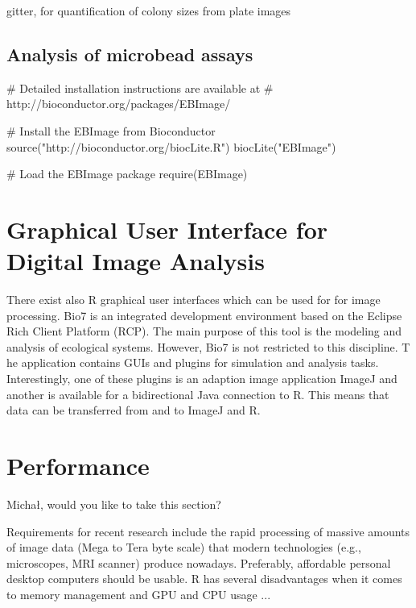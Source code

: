 gitter, for quantification of colony sizes from plate images \citep{wagih_gitter:_2014}


\subsection{Analysis of microbead assays}

\citep{rodiger_nucleic_2014, rodiger_highly_2013}

\begin{example}
# Detailed installation instructions are available at 
# http://bioconductor.org/packages/EBImage/

# Install the EBImage from Bioconductor
source("http://bioconductor.org/biocLite.R")
biocLite("EBImage")

# Load the EBImage package
require(EBImage)


\end{example}


\section{Graphical User Interface for Digital Image Analysis}

There exist also R graphical user interfaces \citep{rodiger_rkward:_2012} which 
can be used for for image processing. Bio7 is an integrated development 
environment based on the Eclipse Rich Client Platform (RCP). The main purpose of 
this tool is the modeling and analysis of ecological systems. However, Bio7 is 
not restricted to this discipline. T he application contains GUIs and plugins 
for simulation and analysis tasks. Interestingly, one of these plugins is an 
adaption image application ImageJ and another is available for a bidirectional 
Java connection to R. This means that data can be transferred from and to ImageJ 
and R.

\section{Performance}

Micha\l{}, would you like to take this section?


Requirements for recent research include the rapid processing of massive amounts 
of image data (Mega to Tera byte scale) that modern technologies (e.g., 
microscopes, MRI scanner) produce nowadays. Preferably, affordable personal desktop
computers should be usable. R has several disadvantages when it comes to memory management
and GPU and CPU usage ...

